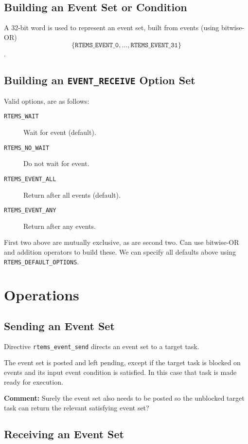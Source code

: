 \subsection{Building an Event Set or Condition}

A 32-bit word is used to represent an event set,
built from events (using bitwise-OR)
$$\{\texttt{RTEMS\_EVENT\_0},\dots,\texttt{RTEMS\_EVENT\_31}\}$$.

\subsection{Building an \texttt{EVENT\_RECEIVE} Option Set}

Valid options, are as follows:
\begin{description}
  \item [\texttt{RTEMS\_WAIT}] Wait for event (default).
  \item [\texttt{RTEMS\_NO\_WAIT}] Do not wait for event.
  \item [\texttt{RTEMS\_EVENT\_ALL}] Return after all events (default).
  \item [\texttt{RTEMS\_EVENT\_ANY}] Return after any events.
\end{description}
First two above are mutually exclusive, as are second two.
Can use bitwise-OR and addition operators to build these.
We can specify all defaults above using \texttt{RTEMS\_DEFAULT\_OPTIONS}.

\newpage
\section{Operations}

\subsection{Sending an Event Set}

Directive \texttt{rtems\_event\_send}
directs an event set to a target task.

The event set is posted and left pending,
except if the target task is blocked on events and its input event condition
is satisfied.
In this case that task is made ready for execution.

\textbf{Comment:}
\textsf{
  Surely the event set also needs to be posted so the unblocked target
  task can return the relevant satisfying event set?
}

\subsection{Receiving an Event Set}

